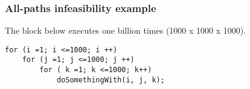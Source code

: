 \begin{frame}[fragile,hasprev=false,hasnext=false]
\label{example:all-paths}
\frametitle{All-paths infeasibility example}

	\begin{block:fact}{}
		The block below executes  one billion times
		(1000 x 1000 x 1000).

\begin{lstlisting}
for (i =1; i <=1000; i ++)
	for (j =1; j <=1000; j ++)
		for ( k =1; k <=1000; k++)
			doSomethingWith(i, j, k);
\end{lstlisting}
	\end{block:fact}

\end{frame}


